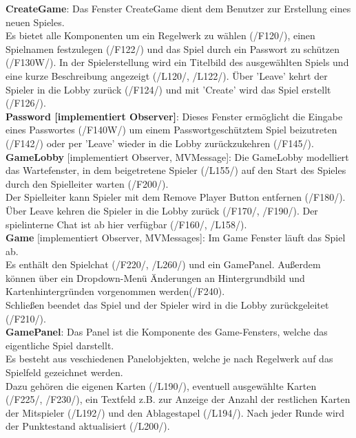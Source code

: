 \documentclass{article}
\begin{document}
\textbf{CreateGame}: Das Fenster CreateGame dient dem Benutzer zur Erstellung eines neuen Spieles.\\
Es bietet alle Komponenten um ein Regelwerk zu wählen (/F120/), einen Spielnamen festzulegen (/F122/) und das Spiel durch ein Passwort zu schützen (/F130W/). In der Spielerstellung wird ein Titelbild des ausgewählten Spiels und eine kurze Beschreibung angezeigt (/L120/, /L122/). Über 'Leave' kehrt der Spieler in die Lobby zurück (/F124/) und mit 'Create' wird das Spiel erstellt (/F126/).\\

\textbf{Password [implementiert Observer]}: Dieses Fenster ermöglicht die Eingabe eines Passwortes (/F140W/) um einem Passwortgeschütztem Spiel beizutreten (/F142/) oder per 'Leave' wieder in die Lobby zurückzukehren (/F145/). \\

\textbf{GameLobby} [implementiert Observer, MVMessage]: Die GameLobby modelliert das Wartefenster, in dem beigetretene Spieler (/L155/) auf den Start des Spieles durch den Spielleiter warten (/F200/).\\
 Der Spielleiter kann Spieler mit dem Remove Player Button entfernen (/F180/). Über Leave kehren die Spieler in die Lobby zurück (/F170/, /F190/). Der spielinterne Chat ist ab hier verfügbar (/F160/, /L158/). \\

\textbf{Game} [implementiert Observer, MVMessages]: Im Game Fenster läuft das Spiel ab.\\
Es enthält den Spielchat (/F220/, /L260/) und ein GamePanel. Außerdem können über ein Dropdown-Menü Änderungen an Hintergrundbild und Kartenhintergründen vorgenommen werden(/F240).\\
Schließen beendet das Spiel und der Spieler wird in die Lobby zurückgeleitet (/F210/).\\

\textbf{GamePanel}: Das Panel ist die Komponente des Game-Fensters, welche das eigentliche Spiel darstellt.\\
Es besteht aus veschiedenen Panelobjekten, welche je nach Regelwerk auf das Spielfeld gezeichnet werden. \\
Dazu gehören die eigenen Karten (/L190/), eventuell ausgewählte Karten (/F225/, /F230/), ein Textfeld z.B. zur Anzeige der Anzahl der restlichen Karten der Mitspieler (/L192/) und den Ablagestapel (/L194/). Nach jeder Runde wird der Punktestand  aktualisiert (/L200/). \\
\end{document}
